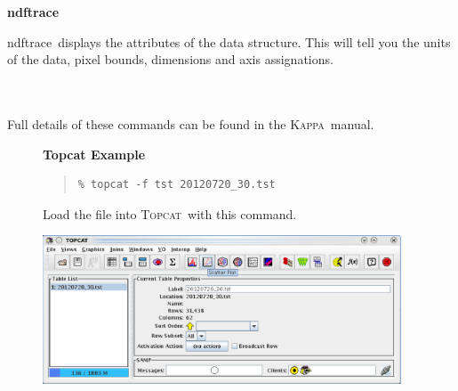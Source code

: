 \documentclass[twoside,11pt]{article}
\newcommand{\htmladdnormallink}[2]{#1}
\newenvironment{latexonly}{}{}
\newcommand{\xref}[3]{#1}
\renewcommand{\_}{\texttt{\symbol{95}}}
\newenvironment{fmpage}[1]{\begin{lrbox}{\fmbox}\begin{minipage}{#1}}{\end{minipage}\end{lrbox}\fbox{\usebox{\fmbox}}}
\newenvironment{myquote}{\begin{quote}\begin{small}}{\end{small}\end{quote}}
\newcommand{\Kappa}{\xref{\textsc{Kappa}}{sun95}{}}
\newcommand{\topcat}{\htmladdnormallink{\textsc{Topcat}}{http://www.starlink.ac.uk/topcat}}
\newcommand{\task}[1]{\textsf{#1}}
\newcommand{\ndftrace}{\xref{\task{ndftrace}}{sun95}{NDFTRACE}}
\begin{document}
\begin{minipage}[t]{0.12\linewidth}
\textbf{ndftrace}
\end{minipage}
\begin{minipage}[t]{0.85\linewidth}
\ndftrace\ displays the attributes of the data structure. This will tell
you the units of the data, pixel bounds, dimensions and axis assignations.\\
\end{minipage}
\\ \\
Full details of these commands can be found in the \xref{\Kappa\ manual}{sun95}{}.

\begin{latexonly}
\begin{figure}[ht!]
\begin{center}
\begin{fmpage}{0.95\linewidth}
\vspace{0.2cm}
\textbf{ Topcat Example}

\vspace{0.5cm}

\begin{minipage}[c]{0.6\linewidth}

\begin{myquote}
\begin{verbatim}
% topcat -f tst 20120720_30.tst
\end{verbatim}
\end{myquote}
\end{minipage}
\hspace{0.3cm}
\begin{minipage}[c]{0.32\linewidth}
Load the file into \topcat\ with this command.
\end{minipage}

\vspace{0.5cm}

\begin{minipage}[c]{0.6\linewidth}
\centering
\includegraphics[width=0.95\textwidth]{sc21_topcat1.eps}


\end{minipage}
\end{fmpage}
\end{center}
\end{figure}
\end{latexonly}
\end{document}
